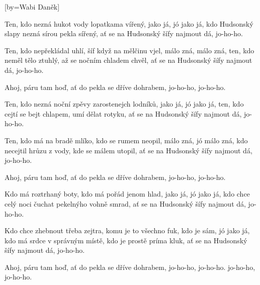 [by={Wabi Daněk}]

\beginverse{}
Ten, kdo nezná hukot vody lopatkama vířený,
jako já, jó jako já,
kdo Hudsonský slapy nezná sírou pekla sířený,
ať se na Hudsonský šífy najmout dá, jo-ho-ho.
\endverse{}

\beginverse{}
Ten, kdo nepřekládal uhlí, šíf když na mělčinu vjel,
málo zná, málo zná,
ten, kdo neměl tělo ztuhlý, až se nočním chladem chvěl,
ať se na Hudsonský šífy najmout dá, jo-ho-ho.
\endverse{}

\beginchorus{}
Ahoj, páru tam hoď, ať do pekla se dříve dohrabem,
jo-ho-ho, jo-ho-ho.
\endchorus{}

\beginverse{}
Ten, kdo nezná noční zpěvy zarostenejch lodníků,
jako já, jó jako já,
ten, kdo cejtí se bejt chlapem, umí dělat rotyku,
ať se na Hudsonský šífy najmout dá, jo-ho-ho.
\endverse{}

\beginverse{}
Ten, kdo má na bradě mlíko, kdo se rumem neopil,
málo zná, jó málo zná,
kdo necejtil hrůzu z vody, kde se málem utopil,
ať se na Hudsonský šífy najmout dá, jo-ho-ho.
\endverse{}

\beginchorus{}
Ahoj, páru tam hoď, ať do pekla se dříve dohrabem,
jo-ho-ho, jo-ho-ho.
\endchorus{}

\beginverse{}
Kdo má roztrhaný boty, kdo má pořád jenom hlad,
jako já, jó jako já,
kdo chce celý noci čuchat pekelnýho vohně smrad,
ať se na Hudsonský šífy najmout dá, jo-ho-ho.
\endverse{}

\beginverse{}
Kdo chce zhebnout třeba zejtra, komu je to všechno fuk,
kdo je sám, jó jako já,
kdo má srdce v správným místě, kdo je prostě príma kluk,
ať se na Hudsonský šífy najmout dá, jo-ho-ho.
\endverse{}

\beginchorus{}
Ahoj, páru tam hoď, ať do pekla se dříve dohrabem,
jo-ho-ho, jo-ho-ho.
jo-ho-ho, jo-ho-ho.
\endchorus{}

\endsong{}

